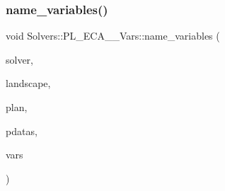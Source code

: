 \subsubsection{\texorpdfstring{name\+\_\+variables()}{name\_variables()}}
{\footnotesize\ttfamily void Solvers\+::\+P\+L\+\_\+\+E\+C\+A\+\_\+\_\+\+Vars\+::name\+\_\+variables (\begin{DoxyParamCaption}\item[{\hyperlink{class_o_s_i___builder}{O\+S\+I\+\_\+\+Builder} \&}]{solver,  }\item[{const \hyperlink{class_landscape}{Landscape} \&}]{landscape,  }\item[{const \hyperlink{class_restoration_plan}{Restoration\+Plan} \&}]{plan,  }\item[{\hyperlink{class_preprocessed_datas}{Preprocessed\+Datas} \&}]{pdatas,  }\item[{const \hyperlink{class_solvers_1_1_p_l___e_c_a__3___vars_1_1_variables}{Variables} \&}]{vars }\end{DoxyParamCaption})}


